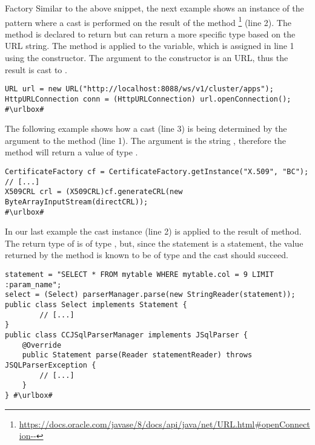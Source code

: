 \begin{pattern}{Factory}
Similar to the above snippet,
the next example shows an instance of the \thisp{} pattern where a cast is performed on the result of the  method%
\footnote{\url{https://docs.oracle.com/javase/8/docs/api/java/net/URL.html\#openConnection--}}
(line 2).
The method is declared to return  but can return a more specific type based on the URL string.
The  method is applied to the  variable,
which is assigned in line 1 using the  constructor.
The argument to the constructor is an  URL,
thus the result is cast to .
\def\urlvar{http://bit.ly/apache_hadoop_2E6KY6T}
\begin{verbatim}
URL url = new URL("http://localhost:8088/ws/v1/cluster/apps");
HttpURLConnection conn = (HttpURLConnection) url.openConnection();
#\urlbox#
\end{verbatim}

The following example shows how a cast (line 3) is being determined by the argument to the  method (line 1).
The argument is the string ,
therefore the method  will return a value of type .

\def\urlvar{http://bit.ly/bcgit_bc_java_2TEVScM}
\begin{verbatim}
CertificateFactory cf = CertificateFactory.getInstance("X.509", "BC");
// [...]
X509CRL crl = (X509CRL)cf.generateCRL(new ByteArrayInputStream(directCRL));
#\urlbox#
\end{verbatim}

In our last example the cast instance (line 2) is applied to the result of  method.
The return type of  is of type , but,
since the statement is a  statement,
the value returned by the  method is known to be of type 
and the cast should succeed.
\def\urlvar{http://bit.ly/JSQLParser_JSqlParser_2TecMyB}
\begin{verbatim}
statement = "SELECT * FROM mytable WHERE mytable.col = 9 LIMIT :param_name";
select = (Select) parserManager.parse(new StringReader(statement));
public class Select implements Statement {
        // [...]
}
public class CCJSqlParserManager implements JSqlParser {
    @Override
    public Statement parse(Reader statementReader) throws JSQLParserException {
        // [...]
    }
} #\urlbox#
\end{verbatim}


\end{pattern}

